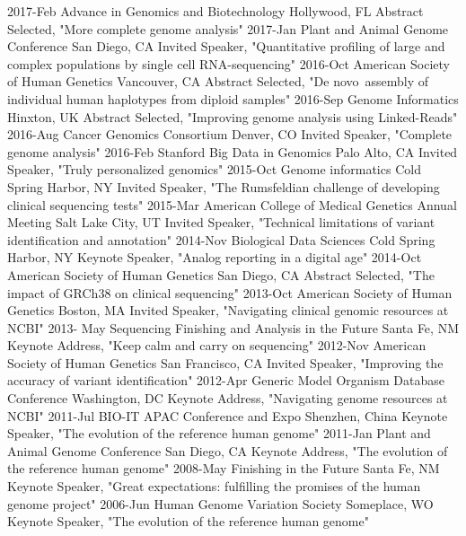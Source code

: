 \documentclass[]{dmc-cv} %
\begin{document}
\begin{entrylist}
\entry
{2017-Feb}
{Advance in Genomics and Biotechnology}
{Hollywood, FL}
{Abstract Selected, "More complete genome analysis"}
\entry
{2017-Jan}
{Plant and Animal Genome Conference}
{San Diego, CA}
{Invited Speaker, "Quantitative profiling of large and complex populations by single cell RNA-sequencing"}
\entry
{2016-Oct}
{American Society of Human Genetics}
{Vancouver, CA}
{Abstract Selected, "De novo assembly of individual human haplotypes from diploid samples"}
\entry
{2016-Sep}
{Genome Informatics}
{Hinxton, UK}
{Abstract Selected, "Improving genome analysis using Linked-Reads"}
\entry
{2016-Aug}
{Cancer Genomics Consortium}
{Denver, CO}
{Invited Speaker, "Complete genome analysis"}
\entry
{2016-Feb}
{Stanford Big Data in Genomics}
{Palo Alto, CA}
{Invited Speaker, "Truly personalized genomics"}
\entry
{2015-Oct}
{Genome informatics}
{Cold Spring Harbor, NY}
{Invited Speaker, "The Rumsfeldian challenge of developing clinical sequencing tests"}
\entry
{2015-Mar}
{American College of Medical Genetics Annual Meeting}
{Salt Lake City, UT}
{Invited Speaker, "Technical limitations of variant identification and annotation"}
\entry
{2014-Nov}
{Biological Data Sciences}
{Cold Spring Harbor, NY}
{Keynote Speaker, "Analog reporting in a digital age"}
\entry
{2014-Oct}
{American Society of Human Genetics}
{San Diego, CA}
{Abstract Selected, "The impact of GRCh38 on clinical sequencing"}
\entry
{2013-Oct}
{American Society of Human Genetics}
{Boston, MA}
{Invited Speaker, "Navigating clinical genomic resources at NCBI"}
\entry
{2013- May}
{Sequencing Finishing and Analysis in the Future}
{Santa Fe, NM}
{Keynote Address, "Keep calm and carry on sequencing"}
\entry
{2012-Nov}
{American Society of Human Genetics}
{San Francisco, CA}
{Invited Speaker, "Improving the accuracy of variant identification"}
\entry
{2012-Apr}
{Generic Model Organism Database Conference}
{Washington, DC}
{Keynote Address, "Navigating genome resources at NCBI"}
\entry
{2011-Jul}
{BIO-IT APAC Conference and Expo}
{Shenzhen, China}
{Keynote Speaker, "The evolution of the reference human genome"}
\entry
{2011-Jan}
{Plant and Animal Genome Conference}
{San Diego, CA}
{Keynote Address, "The evolution of the reference human genome"}
\entry
{2008-May}
{Finishing in the Future}
{Santa Fe, NM}
{Keynote Speaker, "Great expectations: fulfilling the promises of the human genome project"}
\entry
{2006-Jun}
{Human Genome Variation Society}
{Someplace, WO}
{Keynote Speaker, "The evolution of the reference human genome"}
\end{entrylist}
\end{document}

